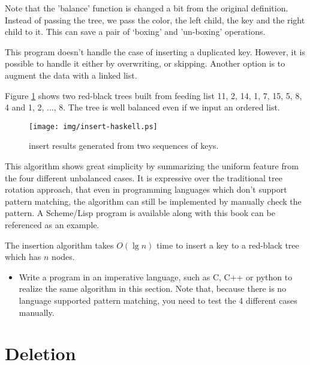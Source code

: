 \documentclass{article}
\begin{document}
Note that the 'balance' function is changed a bit from the original
definition. Instead of passing the tree, we pass
the color, the left child, the key and the right child to it.
This can save a pair of `boxing' and 'un-boxing' operations.

This program doesn't handle the case of inserting a duplicated key.
However, it is possible to handle it either by overwriting,
or skipping. Another option is to augment the data with a linked
list\cite{CLRS}.

Figure \ref{fig:insert-example} shows two red-black trees
built from feeding list 11, 2, 14, 1, 7, 15, 5, 8, 4 and 1, 2, ..., 8. The tree is well balanced even if we input an ordered list.

\begin{figure}[htbp]
  \centering
  \texttt{[image: img/insert-haskell.ps]}
  \caption{insert results generated from two sequences of keys.} \label{fig:insert-example}
\end{figure}

This algorithm shows great simplicity by summarizing the uniform feature
from the four different unbalanced cases. It is expressive over
the traditional tree rotation approach, that even in programming languages
which don't support pattern matching, the algorithm can still be
implemented by manually check the pattern. A Scheme/Lisp program
is available along with this book can be referenced as an example.

The insertion algorithm takes $O(\lg n)$ time to insert a key to
a red-black tree which has $n$ nodes.

\begin{Exercise}

\begin{itemize}
\item Write a program in an imperative language, such as
C, C++ or python to realize the same algorithm in this
section. Note that, because there is no language supported
pattern matching, you need to test the 4 different cases
manually.
\end{itemize}

\end{Exercise}


\section{Deletion}
\end{document}
